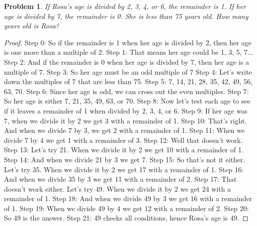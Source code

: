 \documentclass{article}
\newtheorem{theorem}{Problem}
\begin{document}
\begin{theorem}
If Rosa's age is divided by 2, 3, 4, or 6, the remainder is 1. If her age is divided by 7, the remainder is 0. She is less than 75 years old. How many years old is Rosa?
\end{theorem}

\begin{proof}
Step 0: So if the remainder is 1 when her age is divided by 2, then her age is one more than a multiple of 2.
Step 1: That means her age could be 1, 3, 5, 7...
Step 2: And if the remainder is 0 when her age is divided by 7, then her age is a multiple of 7.
Step 3: So her age must be an odd multiple of 7
Step 4: Let's write down the multiples of 7 that are less than 75.
Step 5: 7, 14, 21, 28, 35, 42, 49, 56, 63, 70.
Step 6: Since her age is odd, we can cross out the even multiples.
Step 7: So her age is either 7, 21, 35, 49, 63, or 70.
Step 8: Now let's test each age to see if it leaves a remainder of 1 when divided by 2, 3, 4, or 6.
Step 9: If her age was 7, when we divide it by 2 we get 3 with a remainder of 1.
Step 10: That's right. And when we divide 7 by 3, we get 2 with a remainder of 1.
Step 11: When we divide 7 by 4 we get 1 with a remainder of 3.
Step 12: Well that doesn't work.
Step 13: Let's try 21. When we divide it by 2 we get 10 with a remainder of 1.
Step 14: And when we divide 21 by 3 we get 7.
Step 15: So that's not it either. Let's try 35. When we divide it by 2 we get 17 with a remainder of 1.
Step 16: And when we divide 35 by 3 we get 11 with a remainder of 2.
Step 17: That doesn't work either. Let's try 49. When we divide it by 2 we get 24 with a remainder of 1.
Step 18: And when we divide 49 by 3 we get 16 with a remainder of 1.
Step 19: When we divide 49 by 4 we get 12 with a remainder of 2.
Step 20: So 49 is the answer.
Step 21: 49 checks all conditions, hence Rosa's age is 49.
\end{proof}
\end{document}
